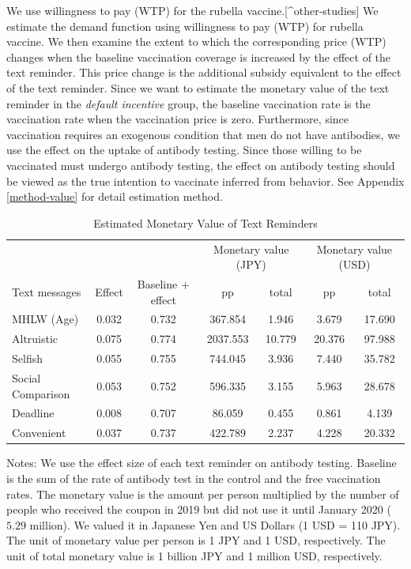 \documentclass[
]{article}
\begin{document}
We use willingness to pay (WTP) for the rubella vaccine.{[}\^{}other-studies{]} We estimate the demand function using willingness to pay (WTP) for rubella vaccine. We then examine the extent to which the corresponding price (WTP) changes when the baseline vaccination coverage is increased by the effect of the text reminder. This price change is the additional subsidy equivalent to the effect of the text reminder. Since we want to estimate the monetary value of the text reminder in the \emph{default incentive} group, the baseline vaccination rate is the vaccination rate when the vaccination price is zero. Furthermore, since vaccination requires an exogenous condition that men do not have antibodies, we use the effect on the uptake of antibody testing. Since those willing to be vaccinated must undergo antibody testing, the effect on antibody testing should be viewed as the true intention to vaccinate inferred from behavior. See Appendix \ref{method-value} for detail estimation method.

\begin{table}

\caption{\label{tab:monetary-value}Estimated Monetary Value of Text Reminders}
\centering
\fontsize{9}{11}\selectfont
\begin{threeparttable}
\begin{tabular}[t]{lcccccc}
\toprule
\multicolumn{3}{c}{ } & \multicolumn{2}{c}{Monetary value (JPY)} & \multicolumn{2}{c}{Monetary value (USD)} \\
\cmidrule(l{3pt}r{3pt}){4-5} \cmidrule(l{3pt}r{3pt}){6-7}
Text messages & Effect & Baseline + effect & pp & total & pp & total\\
\midrule
MHLW (Age) & 0.032 & 0.732 & 367.854 & 1.946 & 3.679 & 17.690\\
Altruistic & 0.075 & 0.774 & 2037.553 & 10.779 & 20.376 & 97.988\\
Selfish & 0.055 & 0.755 & 744.045 & 3.936 & 7.440 & 35.782\\
Social Comparison & 0.053 & 0.752 & 596.335 & 3.155 & 5.963 & 28.678\\
Deadline & 0.008 & 0.707 & 86.059 & 0.455 & 0.861 & 4.139\\
Convenient & 0.037 & 0.737 & 422.789 & 2.237 & 4.228 & 20.332\\
\bottomrule
\end{tabular}
\begin{tablenotes}
\item Notes: We use the effect size of each text reminder on antibody testing. Baseline is the sum of the rate of antibody test in the control and the free vaccination rates. The monetary value is the amount per person multiplied by the number of people who received the coupon in 2019 but did not use it until January 2020 ($5.29$ million). We valued it in Japanese Yen and US Dollars (1 USD = 110 JPY). The unit of monetary value per person is 1 JPY and 1 USD, respectively. The unit of total monetary value is 1 billion JPY and 1 million USD, respectively.
\end{tablenotes}
\end{threeparttable}
\end{table}
\end{document}
